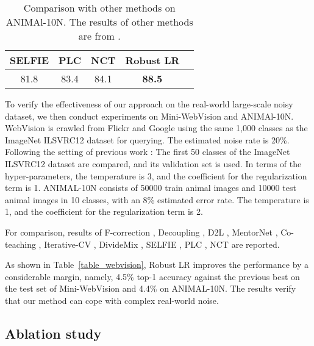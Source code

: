 \documentclass[letterpaper]{article} \usepackage{aaai23}  \usepackage{times}  \usepackage{helvet}  \usepackage{courier}  \usepackage[hyphens]{url}  \usepackage{graphicx} \urlstyle{rm} \def\UrlFont{\rm}  \usepackage{natbib}  \usepackage{caption} \frenchspacing  \setlength{\pdfpagewidth}{8.5in} \setlength{\pdfpageheight}{11in} \usepackage{algorithm}
\begin{document}
\begin{table}
\centering
\begin{tabular}{ccccc}
\toprule
SELFIE & PLC & NCT &  Robust LR\\ \midrule
81.8   & 83.4 & 84.1  &  \textbf{88.5} \\  \bottomrule
\end{tabular}
\caption{Comparison with other methods on ANIMAl-10N. The results of other methods are from \cite{DBLP:conf/cvpr/ChenSHS21}.}
\label{table_ANIMAl}
\end{table}

    
To verify the effectiveness of our approach on the real-world large-scale noisy dataset, we then conduct experiments on Mini-WebVision and ANIMAl-10N.
WebVision is crawled from Flickr and Google using the same 1,000 classes as the ImageNet ILSVRC12 dataset for querying.
The estimated noise rate is 20\%.
Following the setting of previous work \cite{chen2019understanding,li2020dividemix}:
The first 50 classes of the ImageNet ILSVRC12 dataset are compared, and its validation set is used.
In terms of the hyper-parameters, the temperature is 3, and the coefficient for the regularization term is 1.
ANIMAL-10N consists of 50000 train animal images and 10000 test animal images in 10 classes, with an 8\% estimated error rate. 
The temperature is 1, and the coefficient for the regularization term is 2.

For comparison, results of F-correction \cite{patrini2017making}, Decoupling \cite{malach2017decoupling}, D2L \cite{ma2018dimensionality}, MentorNet \cite{jiang2018mentornet}, Co-teaching \cite{han2018co}, Iterative-CV \cite{chen2019understanding}, DivideMix \cite{li2020dividemix}, SELFIE \cite{DBLP:conf/icml/SongK019}, PLC \cite{DBLP:conf/iclr/ZhangZW0021}, NCT \cite{DBLP:conf/cvpr/ChenSHS21} are reported.

    
As shown in Table~\ref{table_webvision}, Robust LR improves the performance by a considerable margin, namely, 4.5\% top-1 accuracy against the previous best on the test set of Mini-WebVision and 4.4\% on ANIMAL-10N.
The results verify that our method can cope with complex real-world noise.


\subsection{Ablation study}
\end{document}
